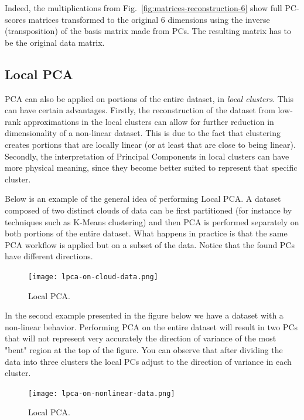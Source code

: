 \documentclass[10pt,twocolumn]{article}
\begin{document}
Indeed, the multiplications from Fig.~\ref{fig:matrices-reconstruction-6} show full PC-scores matrices transformed to the original 6 dimensions using the inverse (transposition) of the basis matrix made from PCs. The resulting matrix has to be the original data matrix.



\subsection{Local PCA}

PCA can also be applied on portions of the entire dataset, in \textit{local clusters}. This can have certain advantages. Firstly, the reconstruction of the dataset from low-rank approximations in the local clusters can allow for further reduction in dimensionality of a non-linear dataset. This is due to the fact that clustering creates portions that are locally linear (or at least that are close to being linear). Secondly, the interpretation of Principal Components in local clusters can have more physical meaning, since they become better suited to represent that specific cluster.

Below is an example of the general idea of performing Local PCA. A dataset composed of two distinct clouds of data can be first partitioned (for instance by techniques such as K-Means clustering) and then PCA is performed separately on both portions of the entire dataset. What happens in practice is that the same PCA workflow is applied but on a subset of the data. Notice that the found PCs have different directions.

\begin{figure}[H]
\centering\texttt{[image: lpca-on-cloud-data.png]}
\caption{Local PCA.}
\label{fig:local-pca-1}
\end{figure}

In the second example presented in the figure below we have a dataset with a non-linear behavior. Performing PCA on the entire dataset will result in two PCs that will not represent very accurately the direction of variance of the most "bent" region at the top of the figure. You can observe that after dividing the data into three clusters the local PCs adjust to the direction of variance in each cluster.

\begin{figure}[H]
\centering\texttt{[image: lpca-on-nonlinear-data.png]}
\caption{Local PCA.}
\label{fig:local-pca-2}
\end{figure}
\end{document}
